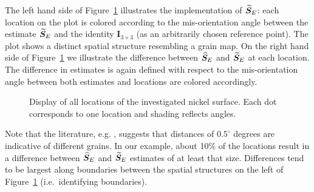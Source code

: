 The left hand side of Figure~\ref{fig:grain-map} illustrates the implementation of ${\widetilde{\bm S}_E}$: each location on the plot is colored according to the mis-orientation angle between  the estimate ${\widetilde{\bm S}_E}$  and the identity $\bm I_{3\times 3}$ (as an arbitrarily chosen reference point).  The plot shows a distinct spatial structure resembling a grain map. On the right hand side of Figure~\ref{fig:grain-map} we illustrate the difference between ${\widehat{\bm S}_E}$ and ${\widetilde{\bm S}_E}$ at each location. The difference in estimates is again defined with respect to the mis-orientation angle between both estimates and locations are colored accordingly. 
%
\begin{figure}[h!] %
   \centering
   \caption{ \label{fig:grain-map}  Display of all locations of the investigated nickel surface. Each dot corresponds to one location and shading reflects  angles. }
\end{figure}
%
Note that the literature, e.g. \cite{bingham10b}, suggests that distances of $0.5^\circ$ degrees are indicative of different grains. In our example, about 10\% of the locations result in a difference between ${\widehat{\bm S}_E}$ and ${\widetilde{\bm S}_E}$ estimates of at least that size. Differences tend to be largest along boundaries between the spatial structures on the left of Figure~\ref{fig:grain-map}  (i.e.~identifying boundaries). 


